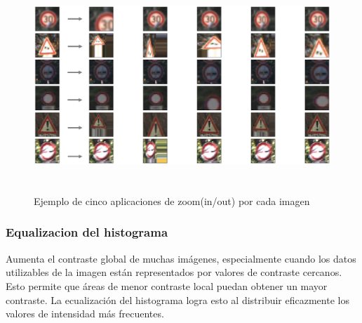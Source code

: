 		\begin{figure}[H]
			\begin{center}
			\includegraphics[width=1\textwidth,height=8cm]{images/desarrollo/Augment/zoom_inv}
			\end{center}
			\begin{center}
			\vspace{0.5em}
			\caption{\small{Ejemplo de cinco aplicaciones de zoom(in/out) por cada imagen}}
			\vspace{-1em}
		{\small{\fontsize{10}{16.8}\selectfont {Fuente propia}}}
			\end{center}
			\vspace{-1.5em}
		\end{figure}


	\subsubsection{Equalizacion del histograma}
		Aumenta el contraste global de muchas imágenes, especialmente cuando los datos utilizables de la imagen están representados por valores de contraste cercanos. Esto permite que áreas de menor contraste local puedan obtener un mayor contraste. La ecualización del histograma logra esto al distribuir eficazmente los valores de intensidad más frecuentes.

